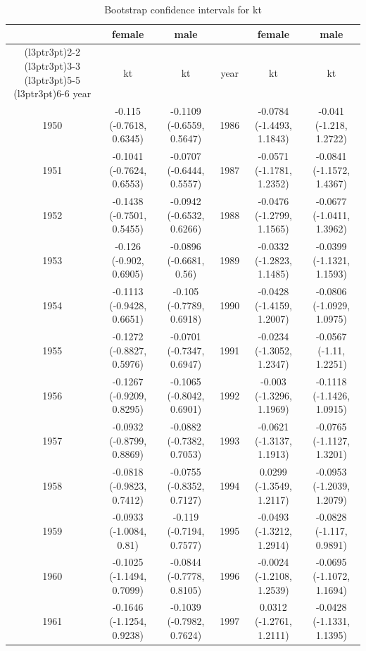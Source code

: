 \documentclass[
  12pt,
]{report}
\begin{document}
\begin{table}[!h]
\centering
\caption{\label{tab:unnamed-chunk-16}Bootstrap confidence intervals for kt}
\centering
\begin{tabular}[t]{ccc|>{}ccc}
\toprule
\multicolumn{1}{c}{ } & \multicolumn{1}{c}{female} & \multicolumn{1}{c}{male} & \multicolumn{1}{c}{ } & \multicolumn{1}{c}{female} & \multicolumn{1}{c}{male} \\
\cmidrule(l{3pt}r{3pt}){2-2} \cmidrule(l{3pt}r{3pt}){3-3} \cmidrule(l{3pt}r{3pt}){5-5} \cmidrule(l{3pt}r{3pt}){6-6}
year & kt & kt & year & kt & kt\\
\midrule
1950 & -0.115 (-0.7618, 0.6345) & -0.1109 (-0.6559, 0.5647) & 1986 & -0.0784 (-1.4493, 1.1843) & -0.041 (-1.218, 1.2722)\\
1951 & -0.1041 (-0.7624, 0.6553) & -0.0707 (-0.6444, 0.5557) & 1987 & -0.0571 (-1.1781, 1.2352) & -0.0841 (-1.1572, 1.4367)\\
1952 & -0.1438 (-0.7501, 0.5455) & -0.0942 (-0.6532, 0.6266) & 1988 & -0.0476 (-1.2799, 1.1565) & -0.0677 (-1.0411, 1.3962)\\
1953 & -0.126 (-0.902, 0.6905) & -0.0896 (-0.6681, 0.56) & 1989 & -0.0332 (-1.2823, 1.1485) & -0.0399 (-1.1321, 1.1593)\\
1954 & -0.1113 (-0.9428, 0.6651) & -0.105 (-0.7789, 0.6918) & 1990 & -0.0428 (-1.4159, 1.2007) & -0.0806 (-1.0929, 1.0975)\\
1955 & -0.1272 (-0.8827, 0.5976) & -0.0701 (-0.7347, 0.6947) & 1991 & -0.0234 (-1.3052, 1.2347) & -0.0567 (-1.11, 1.2251)\\
1956 & -0.1267 (-0.9209, 0.8295) & -0.1065 (-0.8042, 0.6901) & 1992 & -0.003 (-1.3296, 1.1969) & -0.1118 (-1.1426, 1.0915)\\
1957 & -0.0932 (-0.8799, 0.8869) & -0.0882 (-0.7382, 0.7053) & 1993 & -0.0621 (-1.3137, 1.1913) & -0.0765 (-1.1127, 1.3201)\\
1958 & -0.0818 (-0.9823, 0.7412) & -0.0755 (-0.8352, 0.7127) & 1994 & 0.0299 (-1.3549, 1.2117) & -0.0953 (-1.2039, 1.2079)\\
1959 & -0.0933 (-1.0084, 0.81) & -0.119 (-0.7194, 0.7577) & 1995 & -0.0493 (-1.3212, 1.2914) & -0.0828 (-1.117, 0.9891)\\
1960 & -0.1025 (-1.1494, 0.7099) & -0.0844 (-0.7778, 0.8105) & 1996 & -0.0024 (-1.2108, 1.2539) & -0.0695 (-1.1072, 1.1694)\\
1961 & -0.1646 (-1.1254, 0.9238) & -0.1039 (-0.7982, 0.7624) & 1997 & 0.0312 (-1.2761, 1.2111) & -0.0428 (-1.1331, 1.1395)\\

\end{tabular}
\end{table}
\end{document}

